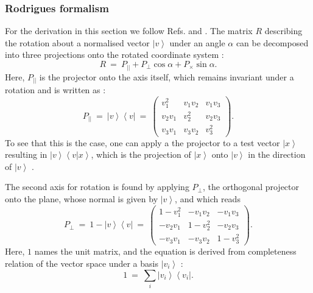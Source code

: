 \subsubsection{Rodrigues formalism}
For the derivation in this section we follow Refs. \cite[p. 718, p. 816]{Arens2015} and \cite{wiki_rodrigues}.
The matrix $R$ describing the rotation about a normalised vector $\left|v\right>$ under an angle $\alpha$ can be decomposed into
three projections onto the rotated coordinate system \cite[p. 718, p. 816]{Arens2015}:
\begin{equation}
	\boxed{R \ = \ P_{||} + P_{\perp} \cos \alpha + P_{\times} \sin \alpha.}
	\label{eq:rodrigues}
\end{equation}
Here, $P_{||}$ is the projector onto the axis itself, which remains invariant under a rotation and is written as \cite[p. 814]{Arens2015}:
\begin{equation}
	P_{||} \ =\ \left|v\right> \left<v\right| \ =\ 
		\left( \begin{array}{ccc} 
			v_1^2   &    v_1 v_2 &       v_1 v_3 \\
			v_2 v_1 &      v_2^2 &       v_2 v_3 \\
			v_3 v_1 &    v_3 v_2 &         v_3^2
		\end{array} \right).
\end{equation}
To see that this is the case, one can apply a the projector to a test vector $\left| x \right>$ resulting in $\left|v\right> \left<v | x \right>$,
which is the projection of $\left| x \right>$ onto $\left| v \right>$ in the direction of $\left| v \right>$ \cite[p. 814]{Arens2015}.

The second axis for rotation is found by applying $P_{\perp}$, the orthogonal projector onto the plane, 
whose normal is given by $\left|v\right>$, and which reads \cite[p. 814]{Arens2015}
\begin{equation}
	P_{\perp} \ =\ 1 - \left|v\right> \left<v\right| \ =\ 
		\left( \begin{array}{ccc} 
			1 - v_1^2    &      - v_1 v_2 &         - v_1 v_3 \\
			   - v_2 v_1 &      1 - v_2^2 &         - v_2 v_3 \\
			   - v_3 v_1 &      - v_3 v_2 &         1 - v_3^2
		\end{array} \right).
\end{equation}
Here, $1$ names the unit matrix, and the equation is derived from completeness relation of the vector space under
a basis $\left| v_i \right>$ \cite[p. 814]{Arens2015}:
\begin{equation}
	1 \ =\  \sum_i \left| v_i \right> \left< v_i \right|.
\end{equation}

